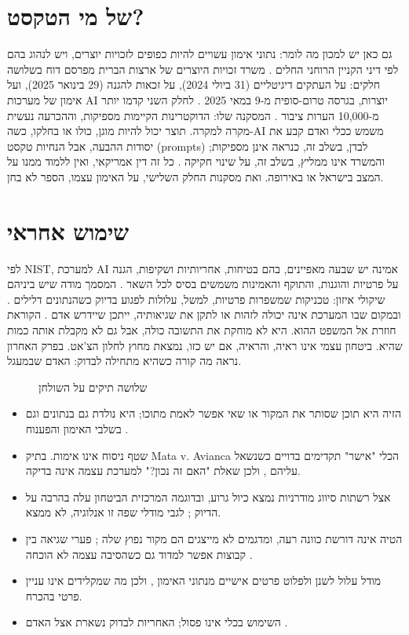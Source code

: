 \section{של מי הטקסט?}
גם כאן יש למכון מה לומר: נתוני אימון עשויים להיות כפופים לזכויות יוצרים, ויש לנהוג בהם לפי דיני הקניין הרוחני החלים \cite{S-ch06-10}. משרד זכויות היוצרים של ארצות הברית מפרסם דוח בשלושה חלקים: על העתקים דיגיטליים (31 ביולי 2024), על זכאות להגנה (29 בינואר 2025), ועל אימון של מערכות AI יוצרות, בגרסה טרום-סופית מ-9 במאי 2025 \cite{S-ch06-11}. לחלק השני קדמו יותר מ-10,000 הערות ציבור \cite{S-ch06-12}. המסקנה שלו: הדוקטרינות הקיימות מספיקות, וההכרעה נעשית מקרה למקרה. תוצר יכול להיות מוגן, כולו או בחלקו, כשה-AI משמש ככלי ואדם קבע את יסודות ההבעה, אבל הנחיות טקסט (prompts) לבדן, בשלב זה, כנראה אינן מספיקות; והמשרד אינו ממליץ, בשלב זה, על שינוי חקיקה \cite{S-ch06-12}.
כל זה דין אמריקאי, ואין ללמוד ממנו על המצב בישראל או באירופה. ואת מסקנות החלק השלישי, על האימון עצמו, הספר לא בחן.
\section{שימוש אחראי}
לפי NIST, למערכת AI אמינה יש שבעה מאפיינים, בהם בטיחות, אחריותיות ושקיפות, הגנה על פרטיות והוגנות, והתוקף והאמינות משמשים בסיס לכל השאר \cite{S-ch06-10}. המסמך מודה שיש ביניהם שיקולי איזון: טכניקות שמשפרות פרטיות, למשל, עלולות לפגוע בדיוק כשהנתונים דלילים \cite{S-ch06-10}. ובמקום שבו המערכת אינה יכולה לזהות או לתקן את שגיאותיה, ייתכן שיידרש אדם \cite{S-ch06-10}.
הקוראת חוזרת אל המשפט ההוא. היא לא מוחקת את התשובה כולה, אבל גם לא מקבלת אותה כמות שהיא. ביטחון עצמי אינו ראיה, והראיה, אם יש כזו, נמצאת מחוץ לחלון הצ'אט. בפרק האחרון נראה מה קורה כשהיא מתחילה לבדוק: האדם שבמעגל.
\begin{figure}[htbp]
\centering

\caption{שלושה תיקים על השולחן}\label{fig:6.1}
\end{figure}
\begin{insightsbox}
\begin{itemize}
\item הזיה היא תוכן שסותר את המקור או שאי אפשר לאמת מתוכו; היא נולדת גם בנתונים וגם בשלבי האימון והפענוח \cite{S-ch06-02}.
\item שטף ניסוח אינו אימות. בתיק Mata v. Avianca הכלי "אישר" תקדימים בדויים כשנשאל עליהם \cite{S-ch06-13}, ולכן שאלת "האם זה נכון?" למערכת עצמה אינה בדיקה.
\item אצל רשתות סיווג מודרניות נמצא כיול גרוע, ובדוגמה המרכזית הביטחון עלה בהרבה על הדיוק \cite{S-ch06-04,S-ch06-05}; לגבי מודלי שפה זו אנלוגיה, לא ממצא.
\item הטיה אינה דורשת כוונה רעה, ומדגמים לא מייצגים הם מקור נפוץ שלה \cite{S-ch06-10}; פערי שגיאה בין קבוצות אפשר למדוד גם כשהסיבה עצמה לא הוכחה \cite{S-ch02-01}.
\item מודל עלול לשנן ולפלוט פרטים אישיים מנתוני האימון \cite{S-ch06-08}, ולכן מה שמקלידים אינו עניין פרטי בהכרח.
\item השימוש בכלי אינו פסול; האחריות לבדוק נשארת אצל האדם \cite{S-ch06-13}.
\end{itemize}
\end{insightsbox}

